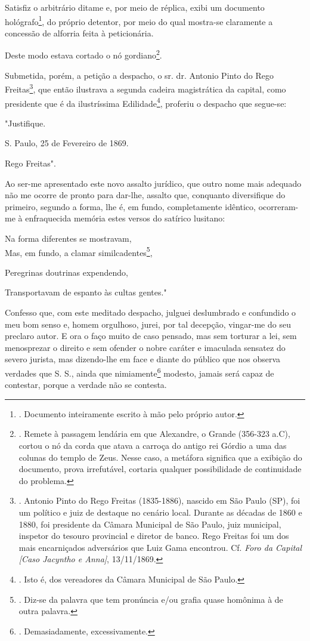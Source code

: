 Satisfiz o arbitrário ditame e, por meio de réplica, exibi um documento
hológrafo\footnote{. Documento inteiramente escrito à mão pelo próprio
  autor.}, do próprio detentor, por meio do qual mostra-se claramente a
concessão de alforria feita à peticionária.

Deste modo estava cortado o nó gordiano\footnote{. Remete à passagem
  lendária em que Alexandre, o Grande (356-323 a.C), cortou o nó da
  corda que atava a carroça do antigo rei Górdio a uma das colunas do
  templo de Zeus. Nesse caso, a metáfora significa que a exibição do
  documento, prova irrefutável, cortaria qualquer possibilidade de
  continuidade do problema.}.

Submetida, porém, a petição a despacho, o sr. dr. Antonio Pinto do Rego
Freitas\footnote{. Antonio Pinto do Rego Freitas (1835-1886), nascido em
  São Paulo (SP), foi um político e juiz de destaque no cenário local.
  Durante as décadas de 1860 e 1880, foi presidente da Câmara Municipal
  de São Paulo, juiz municipal, inspetor do tesouro provincial e diretor
  de banco. Rego Freitas foi um dos mais encarniçados adversários que
  Luiz Gama encontrou. Cf. \emph{Foro da Capital {[}Caso Jacyntho e
  Anna{]}}, 13/11/1869.}, que então ilustrava a segunda cadeira
magistrática da capital, como presidente que é da ilustríssima
Edilidade\footnote{. Isto é, dos vereadores da Câmara Municipal de São
  Paulo.}, proferiu o despacho que segue-se:

"Justifique.

S. Paulo, 25 de Fevereiro de 1869.

Rego Freitas".

Ao ser-me apresentado este novo assalto jurídico, que outro nome mais
adequado não me ocorre de pronto para dar-lhe, assalto que, conquanto
diversifique do primeiro, segundo a forma, lhe é, em fundo,
completamente idêntico, ocorreram-me à enfraquecida memória estes versos
do satírico lusitano:

Na forma diferentes se mostravam,\\
Mas, em fundo, a clamar similcadentes\footnote{. Diz-se da palavra que
  tem pronúncia e/ou grafia quase homônima à de outra palavra.},

Peregrinas doutrinas expendendo,

Transportavam de espanto às cultas gentes."

Confesso que, com este meditado despacho, julguei deslumbrado e
confundido o meu bom senso e, homem orgulhoso, jurei, por tal decepção,
vingar-me do seu preclaro autor. E ora o faço muito de caso pensado, mas
sem torturar a lei, sem menosprezar o direito e sem ofender o nobre
caráter e imaculada sensatez do severo jurista, mas dizendo-lhe em face
e diante do público que nos observa verdades que S. S., ainda que
nimiamente\footnote{. Demasiadamente, excessivamente.} modesto, jamais
será capaz de contestar, porque a verdade não se contesta.

